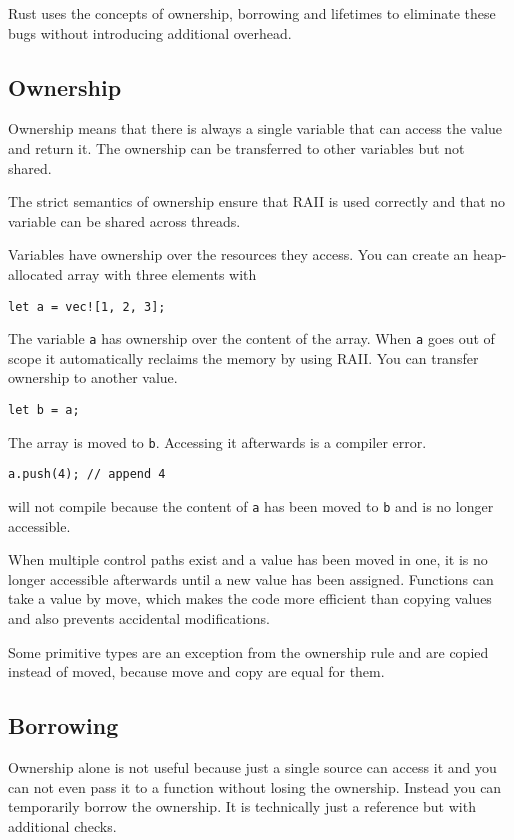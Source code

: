 \documentclass[conference,twocolumn]{IEEEtran}
\begin{document}
Rust uses the concepts of ownership, borrowing and lifetimes to eliminate these bugs without introducing additional overhead.

\subsection{Ownership}

Ownership means that there is always a single variable that can access the value and return it. The ownership can be transferred to other variables but not shared.

The strict semantics of ownership ensure that RAII is used correctly and that no variable can be shared across threads.

Variables have ownership over the resources they access.
You can create an heap-allocated array with three elements with
\begin{lstlisting}
let a = vec![1, 2, 3];
\end{lstlisting}
The variable \verb|a| has ownership over the content of the array. When \verb|a| goes out of scope it automatically reclaims the memory by using RAII.
You can transfer ownership to another value.
\begin{lstlisting}
let b = a;
\end{lstlisting}
The array is moved to \verb|b|. Accessing it afterwards is a compiler error.

\begin{lstlisting}
a.push(4); // append 4
\end{lstlisting}
will not compile because the content of \verb|a| has been moved to \verb|b| and is no longer accessible.

When multiple control paths exist and a value has been moved in one, it is no longer accessible afterwards until a new value has been assigned. Functions can take a value by move, which makes the code more efficient than copying values and also prevents accidental modifications.

Some primitive types are an exception from the ownership rule and are copied instead of moved, because move and copy are equal for them.

\subsection{Borrowing}
Ownership alone is not useful because just a single source can access it and you can not even pass it to a function without losing the ownership.
Instead you can temporarily borrow the ownership. It is technically just a reference but with additional checks.
\end{document}
